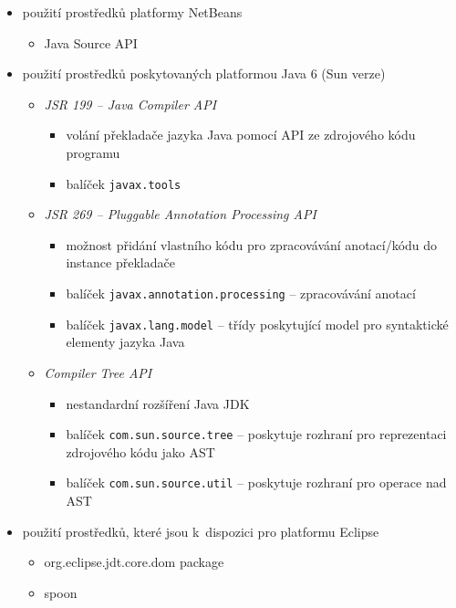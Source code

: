 \begin{itemize}
\begin{itemize}
\begin{itemize}
    \end{itemize}
  \end{itemize}
\item použití prostředků platformy NetBeans \cite{parsertools:javasourcejavadoc}
  \begin{itemize}
  \item Java Source API
  \end{itemize}
\item použití prostředků poskytovaných platformou Java 6 (Sun verze) \cite{source_code_analysis_corejavatechtips}
  \begin{itemize}
  \item \emph{JSR 199 -- Java Compiler API}
    \begin{itemize}
    \item volání překladače jazyka Java pomocí API ze zdrojového kódu programu
    \item balíček \verb+javax.tools+
    \end{itemize}
  \item \emph{JSR 269 -- Pluggable Annotation Processing API}
    \begin{itemize}
    \item možnost přidání vlastního kódu pro zpracovávání anotací/kódu do instance překladače
    \item balíček \verb+javax.annotation.processing+ -- zpracovávání anotací
    \item balíček \verb+javax.lang.model+ -- třídy poskytující model pro syntaktické elementy jazyka Java
    \end{itemize}
  \item \emph{Compiler Tree API} \cite{parsertools:compilertreeapi}
    \begin{itemize}
    \item nestandardní rozšíření Java JDK
    \item balíček \verb+com.sun.source.tree+ -- poskytuje rozhraní pro reprezentaci zdrojového kódu jako AST
    \item balíček \verb+com.sun.source.util+ -- poskytuje rozhraní pro operace nad AST
    \end{itemize}
  \end{itemize}
\item použití prostředků, které jsou k~dispozici pro platformu Eclipse
  \begin{itemize}
  \item org.eclipse.jdt.core.dom package
  \item spoon \cite{parsertools:spoon}
  \end{itemize}
\end{itemize}

